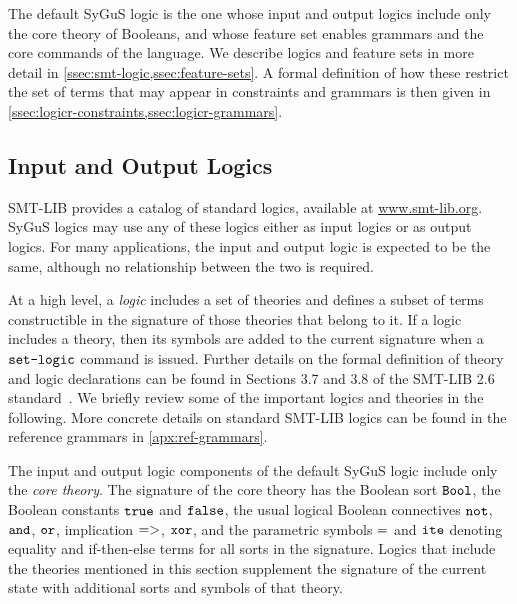 \documentclass[english,a4paper,10pt]{article}
\begin{document}
The default SyGuS logic is the one
whose input and output logics include only the core theory of Booleans,
and whose feature set enables grammars and the core commands of the language.
We describe logics and feature sets
in more detail in \cref{ssec:smt-logic,ssec:feature-sets}.
A formal definition of how these
restrict the set of terms that may appear 
in constraints and grammars
is then given in \cref{ssec:logicr-constraints,ssec:logicr-grammars}.

\subsection{Input and Output Logics}
\label{ssec:smt-logic}

SMT-LIB provides a catalog of standard logics,
available at \url{www.smt-lib.org}.
SyGuS logics may use any of these logics
either as input logics or as output logics.
For many applications,
the input and output logic is expected to be the same, although
no relationship between the two is required.

At a high level, a \emph{logic} includes a set of theories
and defines a subset of terms constructible in the signature of those theories
that belong to it.
If a logic includes a theory, then its symbols are added
to the current signature when a $\texttt{set-logic}$ command is issued.
Further details on the formal definition of 
theory and logic declarations can be found in Sections 3.7 and 3.8
of the SMT-LIB 2.6 standard~\cite{BarFT-RR-17}.
We briefly review some of the important logics and theories in the following.
More concrete details on
standard SMT-LIB logics can be found in the reference
grammars in \cref{apx:ref-grammars}.

The input and output logic components of the default SyGuS logic include only the
\emph{core theory}.
The signature of the core theory 
has the Boolean sort ${\tt Bool}$,
the Boolean constants ${\tt true}$ and ${\tt false}$, the
usual logical Boolean connectives 
${\tt not}$, ${\tt and}$, ${\tt or}$, implication ${\tt =>}$, ${\tt xor}$,
and the parametric symbols ${\tt =}$ and ${\tt ite}$
denoting equality and if-then-else terms for all sorts in the signature.
Logics that include the theories mentioned in this section supplement the signature
of the current state with additional sorts and symbols of that theory.
\end{document}
